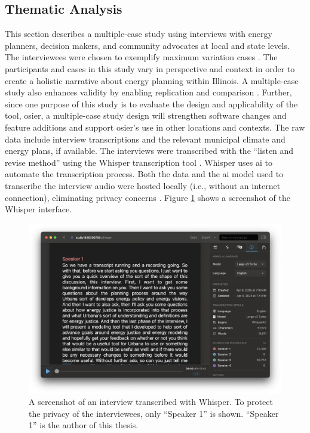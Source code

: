 \subsection{Thematic Analysis}
This section describes a multiple-case study using interviews with energy
planners, decision makers, and community advocates at local and state levels.
The interviewees were chosen to exemplify maximum variation cases
\cite{flyvbjerg_five_2006}. The participants and cases in this study vary in
perspective and context in order to create a holistic narrative about energy
planning within Illinois. A multiple-case study also enhances validity by
enabling replication and comparison \cite{johannsen_designing_2021,
yin_case_2018}. Further, since one purpose of this study is to evaluate the
design and applicability of the tool, \ac{osier}, a multiple-case study design
will strengthen software changes and feature additions and support \ac{osier}'s
use in other locations and contexts. The raw data include interview
transcriptions and the relevant municipal climate and energy plans, if
available. The interviews were transcribed with the ``listen and revise method''
using the Whisper transcription tool \cite{battaglia_listen_2024}. Whisper uses
\ac{ai} to automate the transcription process. Both the data and the \ac{ai}
model used to transcribe the interview audio were hosted locally (i.e., without
an internet connection), eliminating privacy concerns
\cite{battaglia_listen_2024}. Figure \ref{fig:whisper} shows a screenshot of the
Whisper interface. 

\begin{figure}[htbp!]
    \centering
    \includegraphics[width=0.75\columnwidth]{figures/07_interview_chapter/whisper-screenshot.png}
    \caption{A screenshot of an interview transcribed with Whisper. To protect
    the privacy of the interviewees, only ``Speaker 1'' is shown. ``Speaker 1''
    is the author of this thesis.}
    \label{fig:whisper}
\end{figure}

